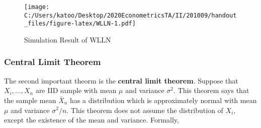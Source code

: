 \documentclass[
  12pt,
]{article}
\newenvironment{Shaded}{\begin{snugshade}}{\end{snugshade}}
\newcommand{\DataTypeTok}[1]{\textcolor[rgb]{0.13,0.29,0.53}{#1}}
\newcommand{\DecValTok}[1]{\textcolor[rgb]{0.00,0.00,0.81}{#1}}
\newcommand{\FloatTok}[1]{\textcolor[rgb]{0.00,0.00,0.81}{#1}}
\newcommand{\KeywordTok}[1]{\textcolor[rgb]{0.13,0.29,0.53}{\textbf{#1}}}
\newcommand{\NormalTok}[1]{#1}
\newcommand{\OperatorTok}[1]{\textcolor[rgb]{0.81,0.36,0.00}{\textbf{#1}}}
\newcommand{\StringTok}[1]{\textcolor[rgb]{0.31,0.60,0.02}{#1}}
\begin{document}
\begin{Shaded}
\end{Shaded}

\begin{figure}
\centering
\texttt{[image: C:/Users/katoo/Desktop/2020EconometricsTA/II/201009/handout\_files/figure-latex/WLLN-1.pdf]}
\caption{Simulation Result of WLLN}
\end{figure}

\hypertarget{central-limit-theorem}{%
\subsubsection{Central Limit Theorem}\label{central-limit-theorem}}

The second important theorm is the \textbf{central limit theorem}.
Suppose that \(X_i, \ldots, X_n\) are IID sample with mean \(\mu\) and
variance \(\sigma^2\). This theorem says that the sample mean
\(\bar{X}_n\) has a distribution which is approximately normal with mean
\(\mu\) and variance \(\sigma^2/n\). This theorem does not assume the
distribution of \(X_i\), except the existence of the mean and variance.
Formally,
\end{document}
